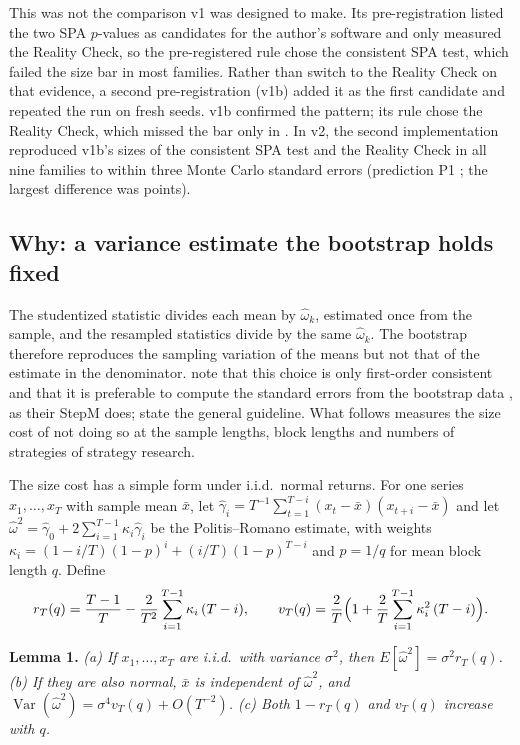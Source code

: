 This was not the comparison v1 was designed to make. Its pre-registration listed the two SPA $p$-values as candidates for the author's software and only measured the Reality Check, so the pre-registered rule chose the consistent SPA test, which failed the size bar in most families. Rather than switch to the Reality Check on that evidence, a second pre-registration (v1b) added it as the first candidate and repeated the run on fresh seeds. v1b confirmed the pattern; its rule chose the Reality Check, which missed the bar only in . In v2, the second implementation reproduced v1b's sizes of the consistent SPA test and the Reality Check in all nine families to within three Monte Carlo standard errors (prediction P1 ; the largest difference was  points).

\subsection{Why: a variance estimate the bootstrap holds fixed}
\label{sec:why}
The studentized statistic divides each mean by $\hat\omega_k$, estimated once from the sample, and the resampled statistics divide by the same $\hat\omega_k$. The bootstrap therefore reproduces the sampling variation of the means but not that of the estimate in the denominator. \citet[footnote~22]{romano2005stepwise} note that this choice is only first-order consistent and that it is preferable to compute the standard errors from the bootstrap data \citep{hall1992bootstrap}, as their StepM does; \citet{hall1991guidelines} state the general guideline. What follows measures the size cost of not doing so at the sample lengths, block lengths and numbers of strategies of strategy research.

The size cost has a simple form under i.i.d.\ normal returns. For one series $x_1,\dots,x_T$ with sample mean $\bar x$, let $\hat\gamma_i=T^{-1}\sum_{t=1}^{T-i}(x_t-\bar x)(x_{t+i}-\bar x)$ and let $\hat\omega^2=\hat\gamma_0+2\sum_{i=1}^{T-1}\kappa_i\hat\gamma_i$ be the Politis--Romano estimate, with weights $\kappa_i=(1-i/T)(1-p)^i+(i/T)(1-p)^{T-i}$ and $p=1/q$ for mean block length $q$. Define
\begin{equation}
r_T(q)=\frac{T-1}{T}-\frac{2}{T^2}\sum_{i=1}^{T-1}\kappa_i\,(T-i),\qquad v_T(q)=\frac{2}{T}\Bigl(1+\frac{2}{T}\sum_{i=1}^{T-1}\kappa_i^2\,(T-i)\Bigr).
\label{eq:rv}
\end{equation}

\noindent\textbf{Lemma 1.} \emph{(a) If $x_1,\dots,x_T$ are i.i.d.\ with variance $\sigma^2$, then $E[\hat\omega^2]=\sigma^2 r_T(q)$. (b) If they are also normal, $\bar x$ is independent of $\hat\omega^2$, and $\operatorname{Var}(\hat\omega^2)=\sigma^4 v_T(q)+O(T^{-2})$. (c) Both $1-r_T(q)$ and $v_T(q)$ increase with $q$.}

